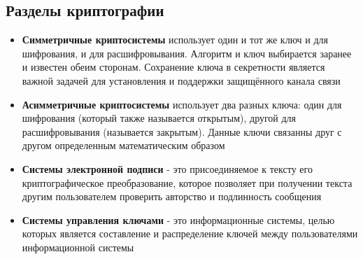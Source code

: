 \subsection{Разделы криптографии}
\begin{itemize}[noitemsep,nolistsep,label={--}]
	\item \textbf{Симметричные криптосистемы} использует один и тот же ключ и для шифрования, и для расшифровывания. Алгоритм и ключ выбирается заранее и известен обеим сторонам. Сохранение ключа в секретности является важной задачей для установления и поддержки защищённого канала связи
	\item \textbf{Асимметричные криптосистемы} использует два разных ключа: один для шифрования (который также называется открытым), другой для расшифровывания (называется закрытым). Данные ключи связанны друг с другом определенным математическим образом
	\item \textbf{Системы электронной подписи} - это присоединяемое к тексту его криптографическое преобразование, которое позволяет при получении текста другим пользователем проверить авторство и подлинность сообщения
	\item \textbf{Системы управления ключами} - это информационные системы, целью которых является составление и распределение ключей между пользователями информационной системы
	
\end{itemize}